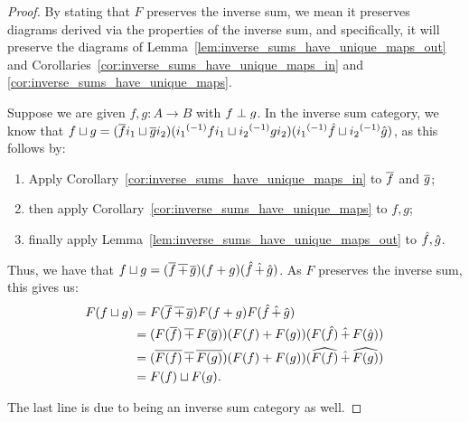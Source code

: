 \begin{proof}
  By stating that $F$ preserves the inverse sum, we mean it preserves diagrams derived via the
  properties of the inverse sum, and specifically, it will preserve the diagrams of
  Lemma~\ref{lem:inverse_sums_have_unique_maps_out} and
  Corollaries~\ref{cor:inverse_sums_have_unique_maps_in} and
  \ref{cor:inverse_sums_have_unique_maps}.

  Suppose we are given $f, g: A \to B$ with $f \perp g$. In the inverse sum category, we know that
  $f \sqcup g = (\overline{f}i_1 \sqcup \overline{g} i_2) ({i_1}^{(-1)} f i_1 \sqcup {i_2}^{(-1)} g i_2)
  ({i_1}^{(-1)} \hat{f} \sqcup {i_2}^{(-1)} \hat{g})$, as this follows by:
  \begin{enumerate}
    \item Apply Corollary~\ref{cor:inverse_sums_have_unique_maps_in} to $\overline{f}$ and $\overline{g}$;
    \item then apply Corollary~\ref{cor:inverse_sums_have_unique_maps} to $f, g$;
    \item finally apply Lemma~\ref{lem:inverse_sums_have_unique_maps_out} to $\hat{f}, \hat{g}$.
  \end{enumerate}

  Thus, we have that $f\sqcup g =
  (\overline{f} \operatorname{\overline{+}} \overline{g})({{f}+{g}})(\hat{f} \operatorname{\hat{+}} \hat{g})$. As $F$ preserves
  the inverse sum, this gives us:
  \begin{align*}
    F(f\sqcup g) &= F(\overline{f}\operatorname{\overline{+}} \overline{g})F({{f}+{g}})F(\hat{f} \operatorname{\hat{+}} \hat{g})\\
    &=(F(\overline{f})\operatorname{\overline{+}} F(\overline{g}))({{F(f)}+{F(g)}})(F(\hat{f}) \operatorname{\hat{+}} F(\hat{g}))\\
    &=(\overline{F(f)}\operatorname{\overline{+}} \overline{F(g)})({{F(f)}+{F(g)}})(\widehat{F(f)} \operatorname{\hat{+}} \widehat{F(g)})\\
    &=F(f) \sqcup F(g).
  \end{align*}

  The last line is due to \Y being an inverse sum category as well.

\end{proof}



